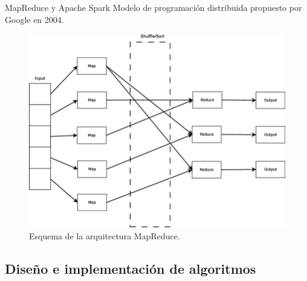 \documentclass[10pt, spanish]{beamer}
\begin{document}
\begin{frame}{MapReduce y Apache Spark}
  Modelo de programación distribuida propuesto por Google en 2004.

  \begin{figure}
	\centering
	\includegraphics[width=.6\textwidth]{img/mapreduce}
	\caption{\footnotesize Esquema de la arquitectura MapReduce.}
\end{figure}
\end{frame}

\subsection{Diseño e implementación de algoritmos}


\end{document}
